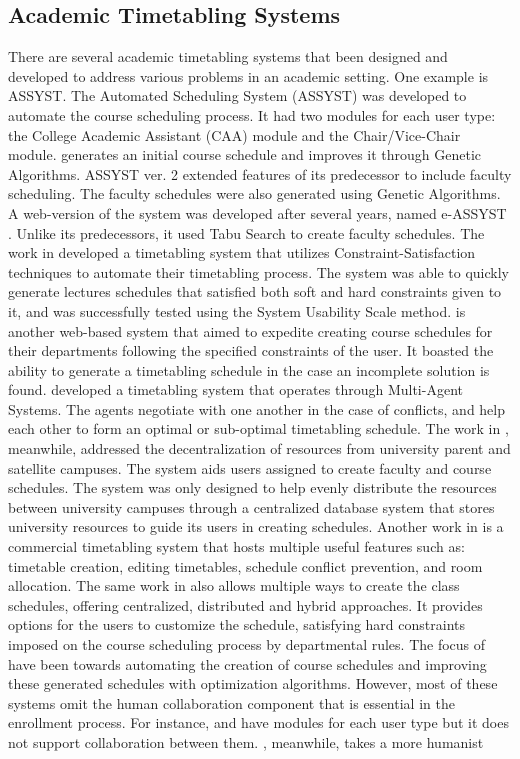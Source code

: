 \subsection{Academic Timetabling Systems}
There are several academic timetabling systems that been designed and developed to address various problems in an academic setting. One example is ASSYST. The Automated Scheduling System (ASSYST) \cite{Assyst} was developed to automate the course scheduling process. It had two modules for each user type: the College Academic Assistant (CAA) module and the Chair/Vice-Chair module. \cite{Assyst} generates an initial course schedule and improves it through Genetic Algorithms. ASSYST ver. 2 \cite{Assyst2} extended features of its predecessor to include faculty scheduling. The faculty schedules were also generated using Genetic Algorithms. A web-version of the system was developed after several years, named e-ASSYST \cite{eAssyst}. Unlike its predecessors, it used Tabu Search to create faculty schedules. The work in \cite{2013Nigeria} developed a timetabling system that utilizes Constraint-Satisfaction techniques to automate their timetabling process. The system was able to quickly generate lectures schedules that satisfied both soft and hard constraints given to it, and was successfully tested using the System Usability Scale method. \cite{UPM} is another web-based system that aimed to expedite creating course schedules for their departments following the specified constraints of the user. It boasted the ability to generate a timetabling schedule in the case an incomplete solution is found. \cite{Oprea2007} developed a timetabling system that operates through Multi-Agent Systems. The agents negotiate with one another in the case of conflicts, and help each other to form an optimal or sub-optimal timetabling schedule. The work in \cite{bulacanState}, meanwhile, addressed the decentralization of resources from university parent and satellite campuses. The system aids users assigned to create faculty and course schedules. The system was only designed to help evenly distribute the resources between university campuses through a centralized database system that stores university resources to guide its users in creating schedules. Another work in \cite{UniTime} is a commercial timetabling system that hosts multiple useful features such as: timetable creation, editing timetables, schedule conflict prevention, and room allocation. The same work in \cite{UniTime} also allows multiple ways to create the class schedules, offering centralized, distributed and hybrid approaches. It provides options for the users to customize the schedule, satisfying hard constraints imposed on the course scheduling process by departmental rules. The focus of \cite{Assyst, Assyst2, eAssyst, UPM, bulacanState, 2013Nigeria, Oprea2007, UniTime} have been towards automating the creation of course schedules and improving these generated schedules with optimization algorithms. However, most of these systems omit the human collaboration component that is essential in the enrollment process. For instance, \cite{Assyst} and \cite{Assyst2} have modules for each user type but it does not support collaboration between them. \cite{arrowSmith}, meanwhile, takes a more humanist 